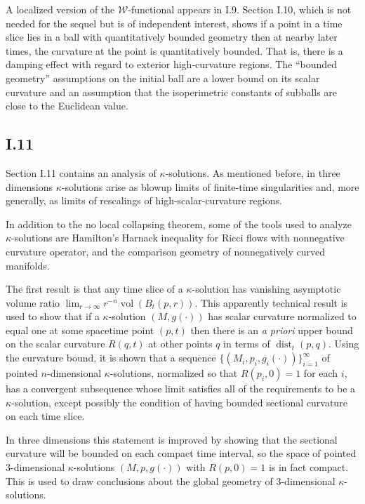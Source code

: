 \documentclass[12pt]{amsart}
\newcommand{\dist}{\operatorname{dist}}
\newcommand{\vol}{\operatorname{vol}}
\numberwithin{equation}{section}
\theoremstyle{plain}
\theoremstyle{definition}
\theoremstyle{remark}
\begin{document}
A localized version of the ${\mathcal W}$-functional appears in I.9.
Section I.10, 
which is not needed for the sequel
but is of independent
interest, shows if a point in a time slice 
lies in a ball with quantitatively bounded geometry then 
at nearby later times, the curvature at the point is quantitatively
bounded.  That is, there is a damping effect with regard to exterior high-curvature 
regions. The ``bounded geometry'' assumptions on the initial
ball are a lower bound on its scalar curvature and an assumption that
the isoperimetric constants of subballs are close to the Euclidean
value.

\subsection{I.11}

Section I.11 contains an analysis of $\kappa$-solutions. As mentioned before, in
three dimensions $\kappa$-solutions arise as blowup limits of finite-time singularities and,
more generally, as limits of rescalings of high-scalar-curvature regions.

In addition to the no local collapsing theorem, some of the tools used to analyze
$\kappa$-solutions are Hamilton's Harnack inequality for Ricci flows with
nonnegative curvature operator, and the comparison geometry of
nonnegatively curved manifolds.

The first result is that any time slice of a $\kappa$-solution
has vanishing asymptotic volume ratio $\lim_{r \rightarrow \infty} r^{-n} \vol(B_t(p, r))$.  
This apparently technical result is used to show that if a
$\kappa$-solution $(M, g(\cdot))$ has scalar curvature normalized to equal
one at some spacetime point $(p,t)$ then there is an {\it a priori} upper bound on
the scalar curvature $R(q,t)$ at other points $q$ in terms of $\dist_t(p,q)$.
Using the curvature
bound, it is shown that a sequence $\{(M_i, p_i, g_i(\cdot)) \}_{i=1}^\infty$ of pointed 
$n$-dimensional $\kappa$-solutions, normalized so that $R(p_i, 0) =1$ for each $i$, has
a convergent subsequence whose limit satisfies all of the requirements to be a
$\kappa$-solution, except possibly the condition of having bounded
sectional curvature on each time slice.

In three dimensions this statement is improved by showing that
the sectional curvature will be bounded on
each 
compact time interval,
so the space of pointed $3$-dimensional $\kappa$-solutions
$(M, p, g(\cdot))$ with $R(p,0) = 1$ is in fact compact. 
This is used to draw conclusions about the global geometry of
$3$-dimensional $\kappa$-solutions.
\end{document}
